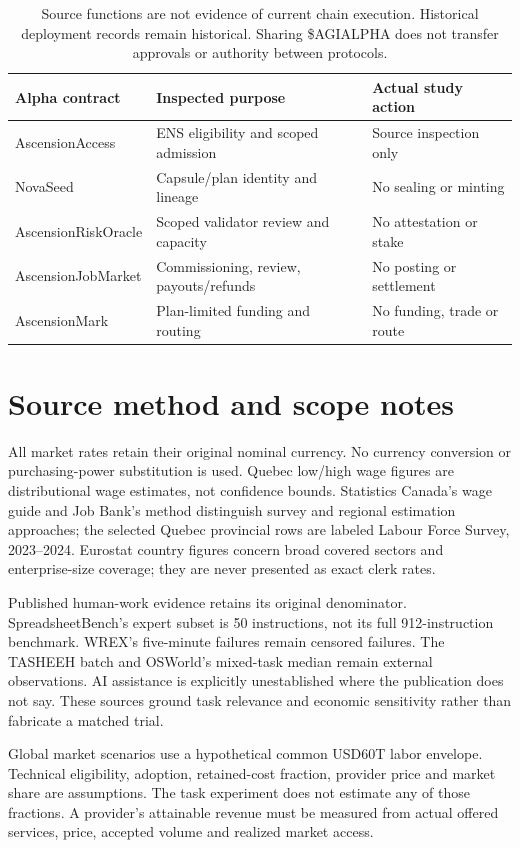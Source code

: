\documentclass[11pt,a4paper]{article}
\newcommand{\smalltable}{\small\setlength{\tabcolsep}{5pt}}
\begin{document}
\begin{table}[H]\centering\smalltable
\begin{tabularx}{\linewidth}{P{.28\linewidth}YY}
\toprule Alpha contract & Inspected purpose & Actual study action\\\midrule
AscensionAccess & ENS eligibility and scoped admission & Source inspection only\\
NovaSeed & Capsule/plan identity and lineage & No sealing or minting\\
AscensionRiskOracle & Scoped validator review and capacity & No attestation or stake\\
AscensionJobMarket & Commissioning, review, payouts/refunds & No posting or settlement\\
AscensionMark & Plan-limited funding and routing & No funding, trade or route\\
\bottomrule
\end{tabularx}
\caption{Source functions are not evidence of current chain execution. Historical deployment records remain historical. Sharing \$AGIALPHA does not transfer approvals or authority between protocols.}
\end{table}

\section{Source method and scope notes}

All market rates retain their original nominal currency. No currency conversion or purchasing-power substitution is used. Quebec low/high wage figures are distributional wage estimates, not confidence bounds. Statistics Canada's wage guide and Job Bank's method distinguish survey and regional estimation approaches; the selected Quebec provincial rows are labeled Labour Force Survey, 2023--2024. Eurostat country figures concern broad covered sectors and enterprise-size coverage; they are never presented as exact clerk rates.

Published human-work evidence retains its original denominator. SpreadsheetBench's expert subset is 50 instructions, not its full 912-instruction benchmark. WREX's five-minute failures remain censored failures. The TASHEEH batch and OSWorld's mixed-task median remain external observations. AI assistance is explicitly unestablished where the publication does not say. These sources ground task relevance and economic sensitivity rather than fabricate a matched trial.

Global market scenarios use a hypothetical common USD60T labor envelope. Technical eligibility, adoption, retained-cost fraction, provider price and market share are assumptions. The task experiment does not estimate any of those fractions. A provider's attainable revenue must be measured from actual offered services, price, accepted volume and realized market access.

\begingroup\small\raggedright


\endgroup
\end{document}
